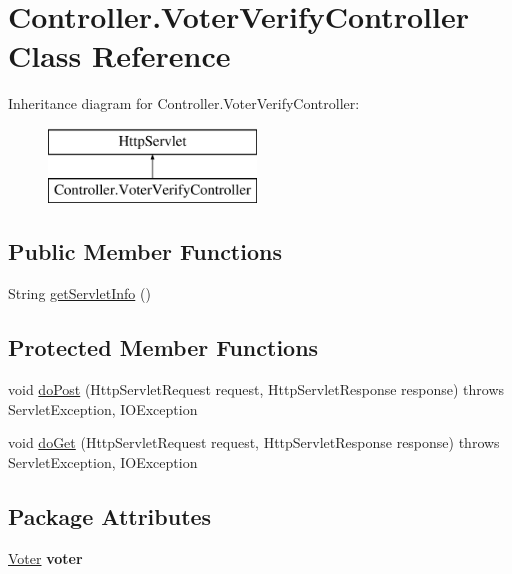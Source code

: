 \hypertarget{class_controller_1_1_voter_verify_controller}{}\section{Controller.\+Voter\+Verify\+Controller Class Reference}
\label{class_controller_1_1_voter_verify_controller}
Inheritance diagram for Controller.\+Voter\+Verify\+Controller\+:\begin{figure}[H]
\begin{center}
\leavevmode
\includegraphics[height=2.000000cm]{class_controller_1_1_voter_verify_controller}
\end{center}
\end{figure}
\subsection*{Public Member Functions}
\begin{DoxyCompactItemize}
\item 
String \mbox{\hyperlink{class_controller_1_1_voter_verify_controller_a57f7407248895d96b9b0bf44d6298c42}{get\+Servlet\+Info}} ()
\end{DoxyCompactItemize}
\subsection*{Protected Member Functions}
\begin{DoxyCompactItemize}
\item 
void \mbox{\hyperlink{class_controller_1_1_voter_verify_controller_ab5f89ba4734caa0ce7590c3e29aaa34b}{do\+Post}} (Http\+Servlet\+Request request, Http\+Servlet\+Response response)  throws Servlet\+Exception, I\+O\+Exception 
\item 
void \mbox{\hyperlink{class_controller_1_1_voter_verify_controller_a8d8e998154d612d28890adc5b5135f74}{do\+Get}} (Http\+Servlet\+Request request, Http\+Servlet\+Response response)  throws Servlet\+Exception, I\+O\+Exception 
\end{DoxyCompactItemize}
\subsection*{Package Attributes}
\begin{DoxyCompactItemize}
\item 
\mbox{\label{class_controller_1_1_voter_verify_controller_afec4d5e5ab7a2c14ca1bd5f94119ceb7}} 
\mbox{\hyperlink{class_models_1_1_voter}{Voter}} {\bfseries voter}
\end{DoxyCompactItemize}
